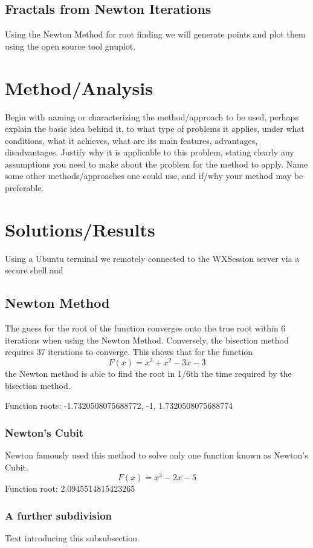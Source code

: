 \documentclass[11pt]{article}
\begin{document}
\subsection{Fractals from Newton Iterations}\label{S:2.2}
Using the Newton Method for root finding we will generate points and plot them using the open source tool gnuplot.

\section{Method/Analysis}\label{S:3}
Begin with naming or characterizing the method/approach to be used, perhaps explain the basic idea behind it, to what type of problems it applies, under what conditions, what it achieves, what are its main features, advantages, disadvantages. Justify why it is applicable to this problem, stating clearly any assumptions you need to make about the problem for the method to apply. Name some other methods/approaches one could use, and if/why your method may be preferable.


\section{Solutions/Results}\label{S:4}
Using a Ubuntu terminal we remotely connected to the WXSession server via a secure shell and 

\subsection{Newton Method}
%
The guess for the root of the function converges onto the true root within 6 iterations when using the Newton Method. Conversely, the bisection method requires 37 iterations to converge. This shows that for the function \[F(x)=x^3+x^2-3x-3\] the Newton method is able to find the root in 1/6th the time required by the bisection method.

Function roots: -1.7320508075688772, -1, 1.7320508075688774
\subsubsection{Newton's Cubit}
%
Newton famously used this method to solve only one function known as Newton's Cubit. \[F(x)=x^3-2x-5\]
Function root: 2.0945514815423265  

\subsubsection{A further subdivision}
%
Text introducing this subsubsection. 
\end{document}
